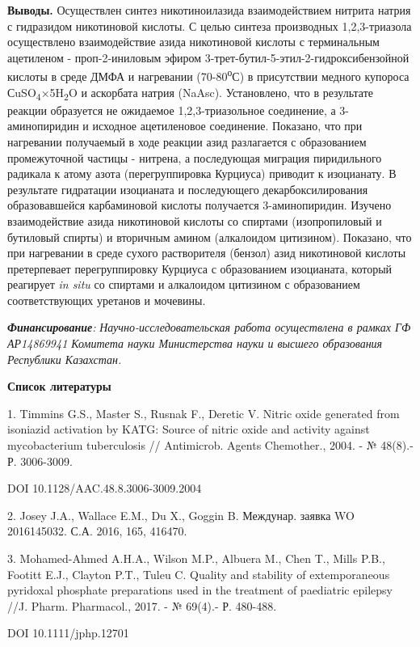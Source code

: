 {\bfseries Выводы.} Осуществлен синтез никотиноилазида взаимодействием
нитрита натрия с гидразидом никотиновой кислоты. С целью синтеза
производных 1,2,3-триазола осуществлено взаимодействие азида никотиновой
кислоты с терминальным ацетиленом - проп-2-иниловым эфиром
3-трет-бутил-5-этил-2-гидроксибензойной кислоты в среде ДМФА и
нагревании (70-80\textsuperscript{о}С) в присутствии медного купороса
СuSO\textsubscript{4}×5H\textsubscript{2}O и аскорбата натрия (NaAsc).
Установлено, что в результате реакции образуется не ожидаемое
1,2,3-триазольное соединение, а 3-аминопиридин и исходное ацетиленовое
соединение. Показано, что при нагревании получаемый в ходе реакции азид
разлагается с образованием промежуточной частицы - нитрена, а
последующая миграция пиридильного радикала к атому азота
(перегруппировка Курциуса) приводит к изоцианату. В результате
гидратации изоцианата и последующего декарбоксилирования образовавшейся
карбаминовой кислоты получается 3-аминопиридин. Изучено взаимодействие
азида никотиновой кислоты со спиртами (изопропиловый и бутиловый спирты)
и вторичным амином (алкалоидом цитизином). Показано, что при нагревании
в среде сухого растворителя (бензол) азид никотиновой кислоты
претерпевает перегруппировку Курциуса с образованием изоцианата, который
реагирует \emph{in situ} со спиртами и алкалоидом цитизином с
образованием соответствующих уретанов и мочевины.

\emph{{\bfseries Финансирование}:} \emph{Научно-исследовательская работа
осуществлена в рамках ГФ АР14869941 Комитета науки Министерства науки и
высшего образования Республики Казахстан.}

{\bfseries Список литературы}

1. Timmins G.S., Master S., Rusnak F., Deretic V. Nitric oxide generated
from isoniazid activation by KATG: Source of nitric oxide and activity
against mycobacterium tuberculosis // Antimicrob. Agents Chemother.,
2004. - № 48(8).- Р. 3006-3009.

DOI 10.1128/AAC.48.8.3006-3009.2004

2. Josey J.A., Wallace E.M., Du X., Goggin B. Междунар. заявка WO
2016145032. С.А. 2016, 165, 416470.

3. Mohamed-Ahmed A.H.A., Wilson M.P., Albuera M., Chen T., Mills P.B.,
Footitt E.J., Clayton P.T., Tuleu C. Quality and stability of
extemporaneous pyridoxal phosphate preparations used in the treatment of
paediatric epilepsy //J. Pharm. Pharmacol., 2017. - № 69(4).- Р.
480-488.

DOI 10.1111/jphp.12701

